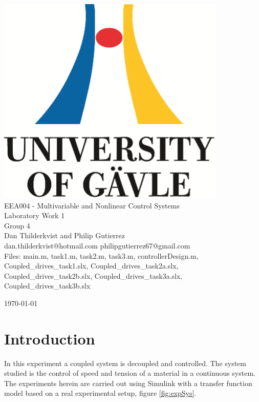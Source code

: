 \documentclass[a4paper, titlepage]{article}
\begin{document}

\begin{titlepage}
  \begin{center}
    \vspace*{1cm}
    \includegraphics[scale=1.0]{../figures/hig_logo_eng.png}\\
    \vspace{1.5cm}
    \large EEA004 - Multivariable and Nonlinear Control Systems\\
    \large Laboratory Work 1\\
    \vspace{1.5cm}
    Group 4\\
    Dan Thilderkvist and Philip Gutierrez\\
    dan.thilderkvist@hotmail.com philipgutierrez67@gmail.com\\
    Files: main.m, task1.m, task2.m, task3.m, controllerDesign.m,  Coupled\_drives\_task1.slx, Coupled\_drives\_task2a.slx, Coupled\_drives\_task2b.slx, Coupled\_drives\_task3a.slx, Coupled\_drives\_task3b.slx
    
    \vspace{1cm}
    \today
  \end{center}
\end{titlepage}

\section{Introduction}
In this experiment a coupled system is decoupled and controlled.
The system studied is the control of speed and tension of a material in a continuous system.
The experiments herein are carried out using Simulink with a transfer function model based on a real experimental setup, figure \ref{fig:expSys}.
\end{document}
